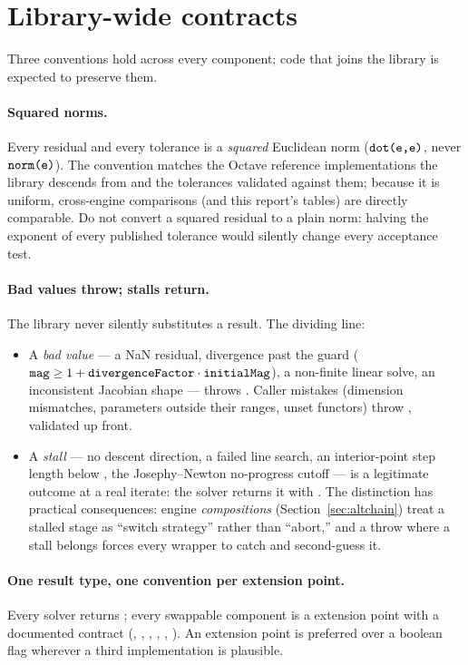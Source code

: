 \section{Library-wide contracts}
\label{sec:contracts}

Three conventions hold across every component; code that joins the library
is expected to preserve them.

\paragraph{Squared norms.} Every residual and every tolerance is a
\emph{squared} Euclidean norm ($\texttt{dot(e,e)}$, never $\texttt{norm(e)}$).
The convention matches the Octave reference implementations the library
descends from and the tolerances validated against them; because it is
uniform, cross-engine comparisons (and this report's tables) are directly
comparable. Do not convert a squared residual to a plain norm: halving the
exponent of every published tolerance would silently change every
acceptance test.

\paragraph{Bad values throw; stalls return.} The library never silently
substitutes a result. The dividing line:
\begin{itemize}
\item A \emph{bad value} --- a NaN residual, divergence past the guard
  ($\texttt{mag} \ge 1 + \texttt{divergenceFactor} \cdot \texttt{initialMag}$), a
  non-finite linear solve, an inconsistent Jacobian shape --- throws
  . Caller mistakes (dimension mismatches,
  parameters outside their ranges, unset functors) throw
  , validated up front.
\item A \emph{stall} --- no descent direction, a failed line search, an
  interior-point step length below , the Josephy--Newton
  no-progress cutoff --- is a legitimate outcome at a real iterate: the
  solver returns it with . The distinction has
  practical consequences: engine \emph{compositions}
  (Section~\ref{sec:altchain}) treat a stalled stage as ``switch strategy''
  rather than ``abort,'' and a throw where a stall belongs forces every
  wrapper to catch and second-guess it.
\end{itemize}

\paragraph{One result type, one convention per extension point.} Every
solver returns ; every swappable component is a
 extension point with a documented contract
(, , ,
, , ). An
extension point is preferred over a boolean flag wherever a third
implementation is plausible.

